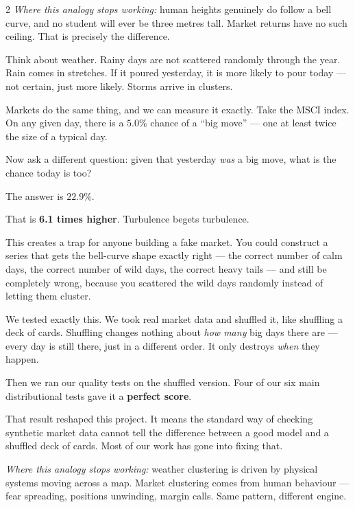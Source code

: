 \documentclass[10pt]{article}
\newcommand{\amberbox}[2]{\begin{tcolorbox}[mybox={Amber}{ABg},title={#1}]#2\end{tcolorbox}}
\begin{document}
\begin{multicols}{2}
{\smallskip
\textit{Where this analogy stops working:} human heights genuinely do follow a bell curve, and no student will ever be three metres tall. Market returns have no such ceiling. That is precisely the difference.}

\columnbreak

\amberbox{4\quad Storms Cluster}{%
Think about weather. Rainy days are not scattered randomly through the year. Rain comes in stretches. If it poured yesterday, it is more likely to pour today --- not certain, just more likely. Storms arrive in clusters.

Markets do the same thing, and we can measure it exactly. Take the MSCI index. On any given day, there is a $5.0\%$ chance of a ``big move'' --- one at least twice the size of a typical day.

Now ask a different question: given that yesterday \emph{was} a big move, what is the chance today is too?

\medskip
The answer is $\mathbf{22.9\%}$.

\medskip
That is \textbf{6.1 times higher}. Turbulence begets turbulence.

This creates a trap for anyone building a fake market. You could construct a series that gets the bell-curve shape exactly right --- the correct number of calm days, the correct number of wild days, the correct heavy tails --- and still be completely wrong, because you scattered the wild days randomly instead of letting them cluster.

We tested exactly this. We took real market data and shuffled it, like shuffling a deck of cards. Shuffling changes nothing about \emph{how many} big days there are --- every day is still there, just in a different order. It only destroys \emph{when} they happen.

Then we ran our quality tests on the shuffled version. Four of our six main distributional tests gave it a \textbf{perfect score}.

That result reshaped this project. It means the standard way of checking synthetic market data cannot tell the difference between a good model and a shuffled deck of cards. Most of our work has gone into fixing that.

\smallskip
\textit{Where this analogy stops working:} weather clustering is driven by physical systems moving across a map. Market clustering comes from human behaviour --- fear spreading, positions unwinding, margin calls. Same pattern, different engine.}

\end{multicols}
\end{document}
